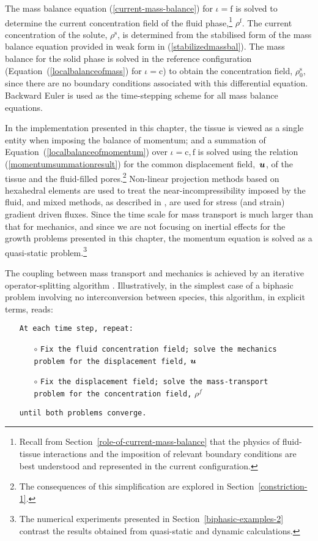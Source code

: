 The mass balance equation (\ref{current-mass-balance}) for
\mbox{$\iota = \mathrm{f}$} is solved to determine the current
concentration field of the fluid phase,\footnote{Recall from
  Section~\ref{role-of-current-mass-balance} that the physics of
  fluid-tissue interactions and the imposition of relevant boundary
  conditions are best understood and represented in the current
  configuration.} $\rho^{\mathrm{f}}$. The current concentration of
the solute, $\rho^{\mathrm{s}}$, is determined from the stabilised
form of the mass balance equation provided in weak form in
(\ref{stabilizedmassbal}). The mass balance for the solid phase is
solved in the reference configuration
(Equation~(\ref{localbalanceofmass}) for \mbox{$\iota = \mathrm{c}$})
to obtain the concentration field, $\rho_{0}^{\mathrm{s}}$, since
there are no boundary conditions associated with this differential
equation. Backward Euler is used as the time-stepping scheme for all
mass balance equations.

In the implementation presented in this chapter, the tissue is viewed
as a single entity when imposing the balance of momentum; and a
summation of Equation~(\ref{localbalanceofmomentum}) over
$\iota=\mathrm{c,f}$ is solved using the relation
(\ref{momentumsummationresult}) for the common displacement
\mbox{field, $\mbox{\boldmath$ u$}$,} of the tissue and the fluid-filled
pores.\footnote{The consequences of this simplification are explored
  in Section~\ref{constriction-1}.} Non-linear projection methods
\citep{simotaylorpister:85} based on hexahedral elements are used to
treat the near-incompressibility imposed by the fluid, and mixed
methods, as described in \cite{Garikipatiox2:01}, are used for stress
(and strain) gradient driven fluxes. Since the time scale for mass
transport is much larger than that for mechanics, and since we are not
focusing on inertial effects for the growth problems presented in this
chapter, the momentum equation is solved as a quasi-static
problem.\footnote{The numerical experiments presented in
  Section~\ref{biphasic-examples-2} contrast the results obtained from
  quasi-static and dynamic calculations.}

The coupling between mass transport and mechanics is achieved by an
iterative operator-splitting algorithm
\citep{Armero-poroplasticity:99, Garikipatietal:01}. Illustratively,
in the simplest case of a biphasic problem involving no
interconversion between species, this algorithm, in explicit terms,
reads:

\begin{itemize}
\item[] {\tt At each time step, repeat:}
  \begin{itemize}
  \item[$\circ$] {\tt Fix the fluid concentration field; solve the
    mechanics\\ problem for the displacement field,} $\mbox{\boldmath$ u$}$
  \item[$\circ$] {\tt Fix the displacement field; solve the
    mass-transport\\ problem for the concentration field,} $\rho^f$
  \end{itemize}
\item[]{\tt until both problems converge.}
\end{itemize}


